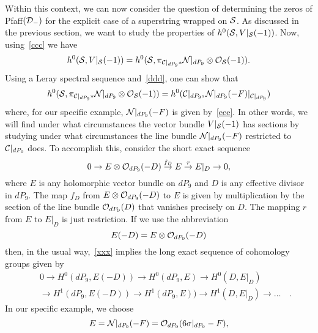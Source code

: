 \documentclass[a4paper,12pt]{article}
\numberwithin{equation}{section}
\theoremstyle{plain}
\begin{document}
Within this context, we can now consider the question of determining the
zeros
of Pfaff$({\cal D}_{-})$ for the explicit case of a superstring wrapped on
${\cal S}$. As discussed in the previous section, we want to study
the properties of $h^{0}({\cal S}, V|_{{\cal S}}(-1))$. Now,
using~\eqref{ccc}
we have
%
\begin{equation}
h^{0}({\cal S}, V|_{{\cal S}}(-1))=
h^{0}({\cal S}, \pi_{{\cal C}|_{dP_9}*}{\cal N}|_{dP_9}
\otimes {\cal O}_{{\cal S}}(-1)).
\label{burt}
\end{equation}
%
Using a Leray spectral sequence and~\eqref{ddd}, one can show that
%
\begin{equation}
h^{0}({\cal S}, \pi_{{\cal C}|_{dP_9}*}{\cal N}|_{dP_9}
\otimes {\cal O}_{{\cal S}}(-1))=
h^{0} ({\cal C}|_{dP_9}, {\cal N}|_{dP_9}(-F)|_{{\cal C}|_{dP_9}})
\label{evgeny}
\end{equation}
%
where, for our specific example, ${\cal N}|_{dP_9}(-F)$ is given
by~\eqref{eee}. In other words, we will find under what circumstances
the vector bundle $V|_{{\cal S}}(-1)$ has sections by studying under what
circumstances the line bundle ${\cal N}|_{dP_9}(-F)$ restricted
to ${\cal C}|_{dP_9}$ does. To accomplish this, consider the short exact
sequence
%
\begin{equation}
0 \rightarrow E \otimes {\cal O}_{dP_9} (-D) \stackrel{f_{D}}{\rightarrow}
E
\stackrel{r}{\rightarrow} E|_{D} \rightarrow 0,
\label{xxx}
\end{equation}
%
where $E$ is any holomorphic vector bundle on $dP_9$ and $D$ is any
effective
divisor in $dP_9$. The map $f_{D}$ from $E \otimes {\cal O}_{dP_9} (-D)$
to $E$ is given by multiplication by the section of the line bundle
${\cal O}_{dP_9} (D)$ that vanishes precisely on $D$. The mapping $r$
from $E$ to $E|_{D}$ is just restriction. If we use the abbreviation
%
\begin{equation}
E(-D)=E \otimes {\cal O}_{dP_9} (-D)
\label{yyyy}
\end{equation}
%
then, in the usual way,~\eqref{xxx} implies the long exact sequence of
cohomology
groups given by
%
\begin{eqnarray}
&&0 \rightarrow H^{0}(dP_9, E(-D))
\rightarrow
H^{0}(dP_9, E) \rightarrow
H^{0}(D, E|_{D}) \nonumber \\
&&\rightarrow H^{1}(dP_9, E(-D))
\rightarrow
H^{1}(dP_9, E))
\rightarrow
H^{1}(D, E|_{D}) \rightarrow \dots
\quad .
\label{big}
\end{eqnarray}
%
In our specific example, we choose
%
\begin{equation}
E= {\cal N}|_{dP_9} (-F) = {\cal O}_{dP_9} (6 \sigma|_{dP_9} -F),
\label{48}
\end{equation}
\end{document}
